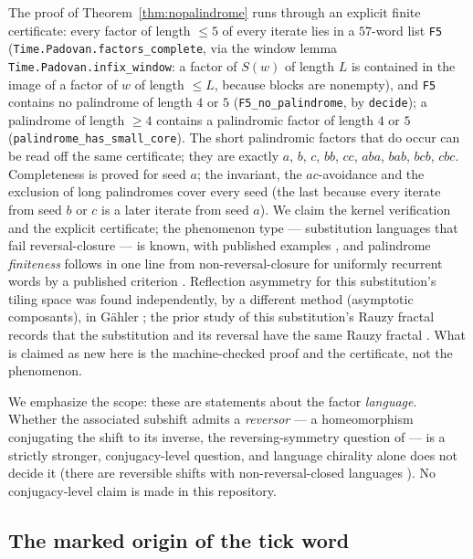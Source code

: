 \documentclass[11pt]{amsart}
\theoremstyle{plain}
\theoremstyle{definition}
\theoremstyle{remark}
\begin{document}
The proof of Theorem~\ref{thm:nopalindrome} runs through an explicit finite certificate:
every factor of length $\le 5$ of every iterate lies in a $57$-word list \texttt{F5}
(\texttt{Time.Padovan.factors\_complete}, via the window lemma
\texttt{Time.Padovan.infix\_window}: a factor of $S(w)$ of length $L$ is contained in the
image of a factor of $w$ of length $\le L$, because blocks are nonempty), and \texttt{F5}
contains no palindrome of length $4$ or $5$ (\texttt{F5\_no\_palindrome}, by
\texttt{decide}); a palindrome of length $\ge 4$ contains a palindromic factor of length $4$
or $5$ (\texttt{palindrome\_has\_small\_core}). The short palindromic factors that do occur
can be read off the same certificate; they are exactly $a$, $b$, $c$, $bb$, $cc$, $aba$, $bab$,
$bcb$, $cbc$. Completeness is proved for seed $a$; the invariant, the $ac$-avoidance and the
exclusion of long palindromes cover every seed (the last because every iterate from seed $b$
or $c$ is a later iterate from seed $a$). We claim the kernel verification and the explicit
certificate; the phenomenon type --- substitution languages that fail reversal-closure ---
is known, with published examples \cite[Ex.~2]{baakeroberts2018} \cite[Ex.~5.3]{balkova2010},
and palindrome \emph{finiteness} follows in one line from non-reversal-closure for uniformly
recurrent words by a published criterion \cite[Thm.~3.2]{balkova2010}. Reflection asymmetry
for this substitution's tiling space was found independently, by a different method
(asymptotic composants), in G\"ahler \cite{gahler2026}; the prior study of this
substitution's Rauzy fractal records that the substitution and its reversal have the same
Rauzy fractal \cite{mercat2020}. What is claimed as
new here is the machine-checked proof and the certificate, not the phenomenon.

We emphasize the scope: these are statements about the factor \emph{language}. Whether the
associated subshift admits a \emph{reversor} --- a homeomorphism conjugating the shift to
its inverse, the reversing-symmetry question of \cite{baakeroberts2018} --- is a strictly
stronger, conjugacy-level question, and language chirality alone does not decide it (there
are reversible shifts with non-reversal-closed languages \cite[Ex.~2]{baakeroberts2018}).
No conjugacy-level claim is made in this repository.

\subsection{The marked origin of the tick word}
\label{sec:origin}
\end{document}
